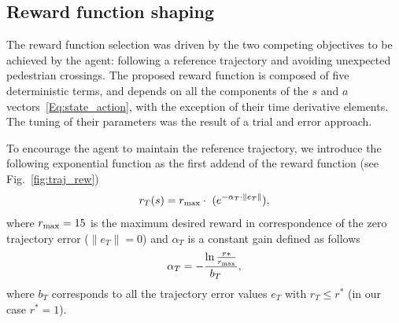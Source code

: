 





\subsection{Reward function shaping}
\label{subsec:reward_shaping}
\label{sub_sec:3-e}
The reward function selection was driven by the two competing objectives to be achieved by the agent: following a reference trajectory and avoiding unexpected pedestrian crossings. The proposed reward function is composed of five deterministic terms, and depends on all the components of the $s$ and $a$ vectors~\eqref{Eq:state_action}, with the exception of their time derivative elements. The tuning of their parameters was the result of a trial and error approach. 


To encourage the agent to maintain the reference trajectory, we introduce the following exponential function as the first addend of the reward function (see Fig.~\ref{fig:traj_rew})
\begin{equation} \label{rewfirst}
r_{{T}}(s)=r_{\rm max}\cdot \  (e^{- \alpha_{T} \cdot \| e_T \|}), 
\end{equation}
where $r_{\rm max}=15$ is the maximum desired reward in correspondence of the zero trajectory error ($\|e_T\|=0$) and $\alpha_T$ is a constant gain defined as follows
\begin{equation}
\alpha_{T} = -
\frac{\ln\frac{r*}{r_{\rm max}}}{b_T\quad},
\end{equation}
where $b_T$ corresponds to all the trajectory error values $e_T$  with $r_T \le r^*$ (in our case $r^*=1$).

